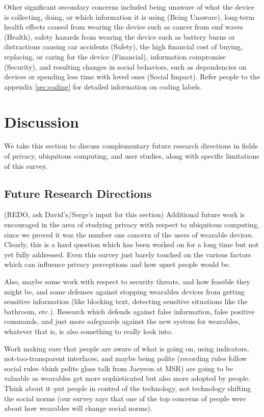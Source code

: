 \documentclass{acm_proc_article-sp}
\begin{document}
Other significant secondary concerns included being unaware of what the device is collecting, doing, or which information it is using (Being Unaware), long-term health effects caused from wearing the device such as cancer from emf waves (Health), safety hazards from wearing the device such as battery burns or distractions causing car accidents (Safety), the high financial cost of buying, replacing, or caring for the device (Financial),  information compromise (Security), and resulting changes in social behaviors, such as dependencies on devices or spending less time with loved ones (Social Impact). Refer people to the appendix \ref{sec:coding} for detailed information on coding labels. 


\section{Discussion}
We take this section to discuss complementary future research directions in fields of privacy, ubiquitous computing, and user studies, along with specific limitations of this survey. 

\subsection{Future Research Directions}
(REDO, ask David's/Serge's input for this section) Additional future work is encouraged in the area of studying privacy with respect to ubiquitous computing, since we proved it was the number one concern of the users of wearable devices. Clearly, this is a hard question which has been worked on for a long time but not yet fully addressed. Even this survey just barely touched on the various factors which can influence privacy perceptions and how upset people would be. 

 Also, maybe some work with respect to security threats, and how feasible they might be, and some defenses against stopping wearables devices from getting sensitive information (like blocking text, detecting sensitive situations like the bathroom, etc.). Research which defends against false information, false positive commands, and just more safeguards against the new system for wearables, whatever that is, is also something to really look into. 
 
 Work making sure that people are aware of what is going on, using indicators, not-too-transparent interfaces, and maybe being polite (recording rules follow social rules--think polite glass talk from Jaeyeon at MSR) are going to be valuable as wearables get more sophisticated but also more adopted by people. Think about it--put people in control of the technology, not technology shifting the social norms (our survey says that one of the top concerns of people were about how wearables will change social norms). 
\end{document}
